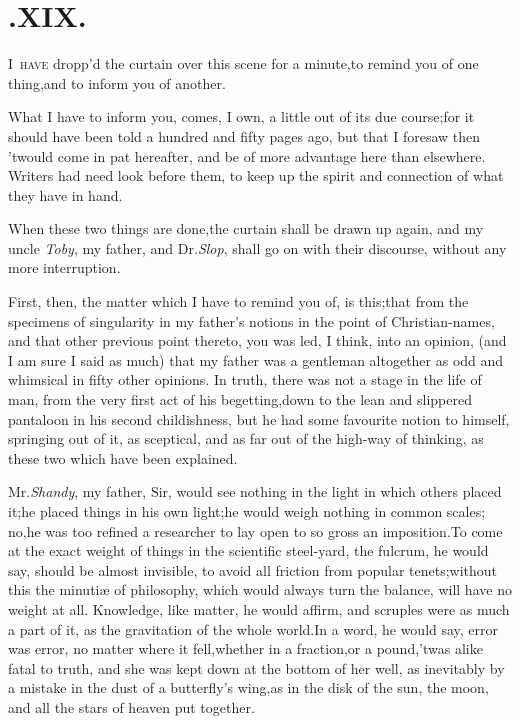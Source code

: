 \documentclass{article}
\begin{document}
\bigskip

\section{.\enspace  XIX.}

\lettrine{I}{\, have} dropp’d the curtain over this\break
scene for a minute,\tsk to remind you of one
thing,\tsk and to inform you of an\-other.

What I have to inform you, comes, I own, a little out of its due
course;\tsh for it should have been told a hundred and
fifty pages ago, but that I foresaw then ’twould come in pat hereafter, and be of
more advantage here than elsewhere.\tsh\break
Writers had need look before them, to keep up the spirit and
connection of what they have in hand.

When these two things are done,\tsk the curtain shall be drawn
up again, and my uncle \textit{Toby}, my father, and Dr.\@ \textit{Slop},
shall go on with their discourse, without any more
interruption.

First, then, the matter which I have to remind you of, is
this;\tsh that from the specimens of singularity in my
father’s notions in the point of Christian-names, and that
other previous point thereto,\tsk\break
you was led, I think, into an opinion,
(and I am sure I said as much) that my father was a
gentleman altogether as odd
and whimsical in fifty other opinions.
In truth, there was not a stage in the life of man, from the very
first act of his begetting,\tsh down to the lean and
slippered pantaloon in his second childishness, but he had some
favourite notion to himself, springing out of it, as sceptical, and
as far out of the high-way of thinking, as these two which have been
explained.

\tsk Mr.\@ \textit{Shandy}, my father, Sir, would see nothing in
the light in which others placed it;\tsk he placed things in his
own light;\tsk he would weigh nothing in common scales;\tsk
no,\tsk he was too refined a researcher to lay open to so gross an
imposition.\tsk To come at the exact weight of things in the
scientific steel-yard, the fulcrum, he would say, should be almost
invisible, to avoid all friction from popular tenets;\tsk without
this the minutiæ of philosophy, which would always turn the
balance, will have no weight at all.\tsk\break
Knowledge, like matter, he would affirm,
and scruples were as much a part of it, as the gravitation of the whole world.\tsk In
a word, he would say, error was error,\tsk\break
no matter where it fell,\tsh whether in a fraction,\tsh or a pound,\tsk ’twas alike
fatal to truth, and she was kept down at the bottom of her well,
as inevitably by a mistake in the dust of a butterfly’s
wing,\break\tsk as in the disk of the sun, the moon, and all the stars
of heaven put together.
\end{document}
